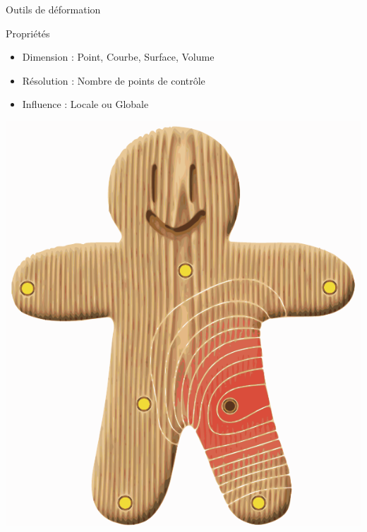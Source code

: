 \documentclass[xcolor=x11names,compress]{beamer}
\renewcommand{\(}{\begin{columns}} \renewcommand{\)}{\end{columns}}
\newcommand{\<}[1]{\begin{column}{#1}} \renewcommand{\>}{\end{column}}
\begin{document}
\begin{frame}{Outils de déformation}
  \begin{exampleblock}{Propriétés}
    \begin{itemize}
      \item Dimension : Point, Courbe, Surface, Volume
      \item Résolution : Nombre de points de contrôle
      \item Influence : Locale ou Globale
    \end{itemize}
  \end{exampleblock}
  \centering
  \includegraphics[scale=0.3]{Bounded-InfluenceLocale}
\end{frame}

\end{document}
